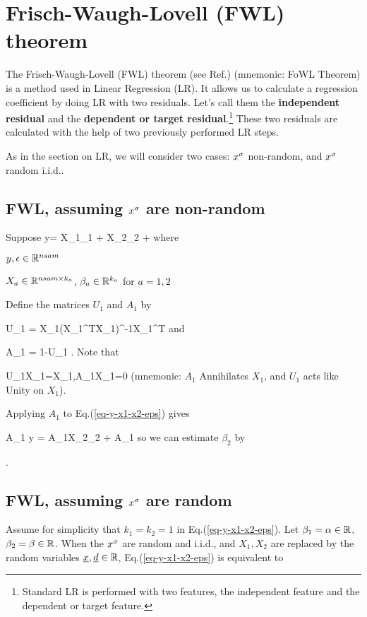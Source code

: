 \chapter{Frisch-Waugh-Lovell (FWL) theorem}
\label{ch-fwl-theo}

The Frisch-Waugh-Lovell (FWL) theorem
(see Ref.\cite{wiki-fwl-theo})
(mnemonic: FoWL Theorem)
is a method used in Linear Regression (LR).
It allows us to
calculate
a regression coefficient
by doing LR with two residuals. Let's call them
the {\bf independent residual} and the
{\bf dependent or target residual}.\footnote{Standard 
LR is performed with two features,
the independent feature and the dependent or target feature.}
These  two residuals are calculated 
with the help of two previously
performed LR steps.

As in the section 
on LR, we will consider
two cases: $x^\sigma$ non-random, and $x^\sigma$ random i.i.d..

\section{FWL, assuming $x^\sigma$ are non-random}
Suppose
\beq
y=  X_1\beta_1 + X_2\beta_2 + \eps
\label{eq-y-x1-x2-eps}
\eeq
where

$y, \epsilon\in { \mathbb{R}}^{nsam}$

$X_a\in { \mathbb{R}}^{nsam\times k_a}$,
$\beta_a\in { \mathbb{R}}^{k_a}$ for $a=1,2$

Define the matrices $U_1$ and $A_1$ by

\beq
U_1 = X_1(X_1^TX_1)^{-1}X_1^T
\eeq
and

\beq
A_1 = 1-U_1
\;.
\eeq
Note that

\beq
U_1X_1=X_1\;,\;\;A_1X_1=0
\eeq
(mnemonic: $A_1$ Annihilates $X_1$,
and $U_1$ acts like Unity on $X_1$).

Applying $A_1$ to Eq.(\ref{eq-y-x1-x2-eps}) gives

\beq
A_1 y = A_1X_2\beta_2  + A_1\eps
\eeq
so we can estimate $\beta_2$ by

\beq
{}
\label{eq-fwl-nonrand}
\;.
\eeq
\section{FWL, assuming $x^\sigma$ are random}


Assume for simplicity that 
$k_1=k_2=1$
in Eq.(\ref{eq-y-x1-x2-eps}). Let
$\beta_1=\alpha\in{ \mathbb{R}}$, 
$\beta_2=\beta\in{ \mathbb{R}}$.
When the $x^\sigma$ are random and i.i.d.,
and
$X_1, X_2$ are
replaced by 
the random variables
${\underline{x}}, {\underline{d}}\in { \mathbb{R}}$,
Eq.(\ref{eq-y-x1-x2-eps})
is equivalent to


